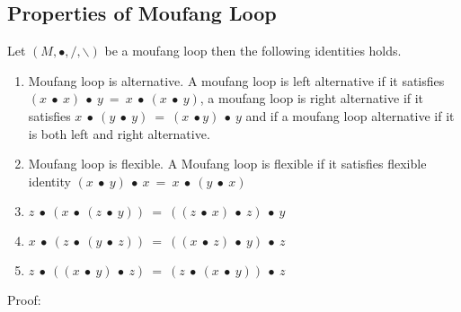 \subsection{Properties of Moufang Loop}
Let $(M, ∙, /, \backslash)$ be a moufang loop then the following identities
holds.
\begin{enumerate}
\item Moufang loop is alternative. A moufang loop is left alternative if it
satisfies \((x\ ∙\ x)\ ∙\ y\ =\ x\ ∙\ (x\ ∙\ y)\), a moufang loop is right
alternative if it satisfies \(x\ ∙\ (y\ ∙\ y)\ =\ (x\ ∙ y)\ ∙\ y\) and if a moufang loop
alternative if it is both left and right alternative. 
\item Moufang loop is flexible. A Moufang loop is flexible if it satisfies
flexible identity $(x\ ∙\ y)\ ∙\ x\ =\ x\ ∙\ (y\ ∙\ x)$
\item $z\ ∙\ (x\ ∙\ (z\ ∙\ y))\ =\ ((z\ ∙\ x)\ ∙\ z)\ ∙\ y$
\item $x\ ∙\ (z\ ∙\ (y\ ∙\ z))\ =\ ((x\ ∙\ z)\ ∙\ y)\ ∙\ z$ 
\item $z\ ∙\ ((x\ ∙\ y)\ ∙\ z)\ =\ (z\ ∙ \ (x\ ∙\ y))\ ∙\ z$ 
\end{enumerate}
Proof:
